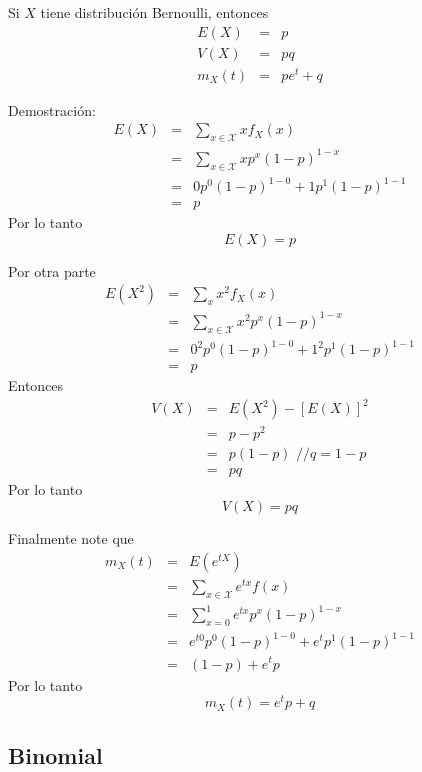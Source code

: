 \begin{i}
\begin{theorem}
Si $X$ tiene distribución Bernoulli, entonces 
\begin{eqnarray*}
E(X) &=&p \\
V(X) &=&pq \\
m_{X}(t) &=&pe^{t}+q
\end{eqnarray*}
\end{theorem}

Demostración:
\begin{eqnarray*}
E(X) &=&\sum_{x\in \mathcal{X}}xf_{X}(x) \\
&=&\sum_{x\in \mathcal{X}}xp^{x}(1-p)^{1-x} \\
&=&0p^{0}(1-p)^{1-0}+1p^{1}(1-p)^{1-1} \\
&=&p
\end{eqnarray*}
Por lo tanto
\begin{equation*}
E(X)=p
\end{equation*}

Por otra parte 
\begin{eqnarray*}
E(X^{2}) &=&\sum_{x}x^{2}f_{X}(x) \\
&=&\sum_{x\in \mathcal{X}}x^{2}p^{x}(1-p)^{1-x} \\
&=&0^{2}p^{0}(1-p)^{1-0}+1^{2}p^{1}(1-p)^{1-1} \\
&=&p
\end{eqnarray*}
Entonces
\begin{eqnarray*}
V(X) &=&E(X^{2})-[E(X)]^{2} \\
&=&p-p^{2} \\
&=&p(1-p)\text{ //}q=1-p \\
&=&pq
\end{eqnarray*}
Por lo tanto
\begin{equation*}
V(X)=pq
\end{equation*}

Finalmente note que 
\begin{eqnarray*}
m_{X}(t) &=&E(e^{tX}) \\
&=&\sum_{x\in \mathcal{X}}e^{tx}f(x) \\
&=&\sum_{x=0}^{1}e^{tx}p^{x}(1-p)^{1-x} \\
&=&e^{t0}p^{0}(1-p)^{1-0}+e^{t}p^{1}(1-p)^{1-1} \\
&=&(1-p)+e^{t}p
\end{eqnarray*}
Por lo tanto
\begin{equation*}
m_{X}(t)=e^{t}p+q
\end{equation*}

\subsection{Binomial}


\end{i}
